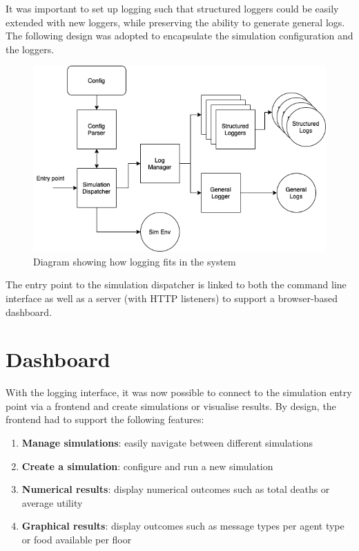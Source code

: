 \begin{multicols}{2}
It was important to set up logging such that structured loggers could be easily extended with new loggers, while preserving the ability to generate general logs. The following design was adopted to encapsulate the simulation configuration and the loggers.

\begin{figure}[htb]
    \centering
    \includegraphics[width=0.8\linewidth]{003_data_logging/images/struct.png}
    \caption{Diagram showing how logging fits in the system}
    \label{fig:design_logging}
\end{figure}

The entry point to the simulation dispatcher is linked to both the command line interface as well as a server (with HTTP listeners) to support a browser-based dashboard.

\section{Dashboard}

With the logging interface, it was now possible to connect to the simulation entry point via a frontend and create simulations or visualise results. By design, the frontend had to support the following features:

\begin{enumerate}
    \item \textbf{Manage simulations}: easily navigate between different simulations
    \item \textbf{Create a simulation}: configure and run a new simulation
    \item \textbf{Numerical results}: display numerical outcomes such as total deaths or average utility
    \item \textbf{Graphical results}: display outcomes such as message types per agent type or food available per floor
\end{enumerate}


\end{multicols}
